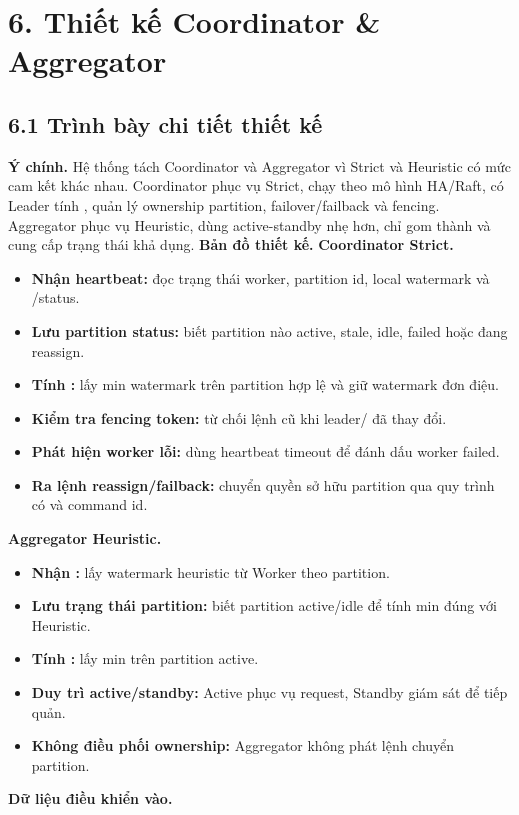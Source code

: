 \documentclass[12pt,a4paper]{article}
\begin{document}
\section{6. Thiết kế Coordinator \& Aggregator}
\label{sec:coordinator-aggregator}

\subsection{6.1 Trình bày chi tiết thiết kế}
\textbf{Ý chính.} Hệ thống tách Coordinator và Aggregator vì Strict và Heuristic có mức cam kết khác nhau. Coordinator phục vụ Strict, chạy theo mô hình HA/Raft, có Leader tính , quản lý ownership partition, failover/failback và fencing. Aggregator phục vụ Heuristic, dùng active-standby nhẹ hơn, chỉ gom  thành  và cung cấp trạng thái khả dụng.
\textbf{Bản đồ thiết kế.}
\textbf{Coordinator Strict.}

\begin{itemize}
\item \textbf{Nhận heartbeat:} đọc trạng thái worker, partition id, local watermark và /status.
\item \textbf{Lưu partition status:} biết partition nào active, stale, idle, failed hoặc đang reassign.
\item \textbf{Tính :} lấy min watermark trên partition hợp lệ và giữ watermark đơn điệu.
\item \textbf{Kiểm tra fencing token:} từ chối lệnh cũ khi leader/ đã thay đổi.
\item \textbf{Phát hiện worker lỗi:} dùng heartbeat timeout để đánh dấu worker failed.
\item \textbf{Ra lệnh reassign/failback:} chuyển quyền sở hữu partition qua quy trình có  và command id.
\end{itemize}
\textbf{Aggregator Heuristic.}

\begin{itemize}
\item \textbf{Nhận :} lấy watermark heuristic từ Worker theo partition.
\item \textbf{Lưu trạng thái partition:} biết partition active/idle để tính min đúng với Heuristic.
\item \textbf{Tính :} lấy min trên partition active.
\item \textbf{Duy trì active/standby:} Active phục vụ request, Standby giám sát để tiếp quản.
\item \textbf{Không điều phối ownership:} Aggregator không phát lệnh chuyển partition.
\end{itemize}
\textbf{Dữ liệu điều khiển vào.}
\end{document}
